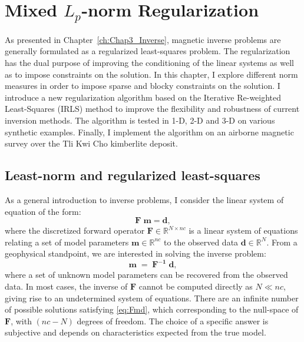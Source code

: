 \graphicspath{{./Figures/}}
\chapter{Mixed $L_p$-norm Regularization}
\label{ch:Chap4_Mixed_Lpnorm_Regularization}
As presented in Chapter~\ref{ch:Chap3_Inverse}, magnetic inverse problems are generally formulated as a regularized least-squares problem.  
The regularization has the dual purpose of improving the conditioning of the linear systems as well as to impose constraints on the solution. 
In this chapter, I explore different norm measures in order to impose sparse and blocky constraints on the solution.
I introduce a new regularization algorithm based on the Iterative Re-weighted Least-Squares (IRLS) method  to improve the flexibility and robustness of current inversion methods.
The algorithm is tested in 1-D, 2-D and 3-D on various synthetic examples.
Finally, I implement the algorithm on an airborne magnetic survey over the Tli Kwi Cho kimberlite deposit.

\section{Least-norm and regularized least-squares}\label{LN_and_RLS}
As a general introduction to inverse problems, I consider the linear system of equation of the form:
\begin{equation}\label{eq:Fmd}
	\mathbf{F \; m = d} ,
\end{equation}
where the discretized forward operator $\mathbf{F} \in \mathbb{R}^{N \times nc}$ is a linear system of equations relating a set of model parameters $\mathbf{m} \in \mathbb{R}^{nc}$ to the observed data $\mathbf{d} \in \mathbb{R}^{N}$. 
From a geophysical standpoint, we are interested in solving the inverse problem:
\begin{equation} \label{eq:Inverse}
\mathbf{m \; = \; F^{-1} \; d},
\end{equation}
where a set of unknown model parameters can be recovered from the observed data.
In most cases, the inverse of $\mathbf{F}$ cannot be computed directly as $ N \ll nc$, giving rise to an undetermined system of equations.
There are an infinite number of possible solutions satisfying \ref{eq:Fmd}, which corresponding to the null-space of $\mathbf{F}$, with $(nc - N)$ degrees of freedom.
The choice of a specific answer is subjective and depends on characteristics expected from the true model. 

